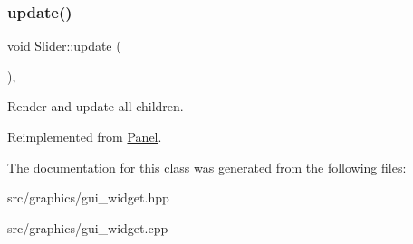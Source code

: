 \subsubsection{\texorpdfstring{update()}{update()}}
{\footnotesize\ttfamily void Slider\+::update (\begin{DoxyParamCaption}{ }\end{DoxyParamCaption})\hspace{0.3cm}{\ttfamily [override]}, {\ttfamily [virtual]}}

Render and update all children. 

Reimplemented from \mbox{\hyperlink{class_panel_a9e9c0608cf3139833cde6b73dc3ba443}{Panel}}.



The documentation for this class was generated from the following files\+:\begin{DoxyCompactItemize}
\item 
src/graphics/gui\+\_\+widget.\+hpp\item 
src/graphics/gui\+\_\+widget.\+cpp\end{DoxyCompactItemize}
